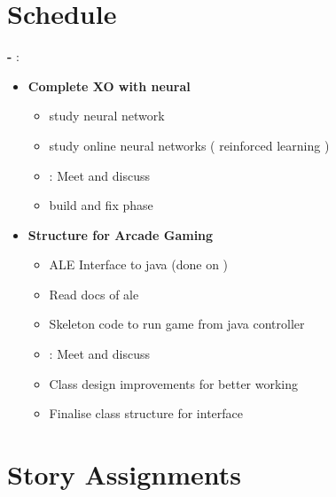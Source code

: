 \documentclass[12pt]{article}
\begin{document}
\section{Schedule}
\textbf{ - } : 
\begin{itemize}
	\item \textbf{Complete XO with neural}
	\begin{itemize}
		\item study neural network \cite{k}
		\item study online neural networks ( reinforced learning ) \cite{k}
		\item {} : Meet and discuss \cite{k}\cite{n}\cite{j}
		\item build and fix phase \cite{j}
	\end{itemize}
	\item \textbf{Structure for Arcade Gaming}
	\begin{itemize}
		\item ALE Interface to java (done on ) \cite{n}
		\item Read docs of ale \cite{n}
		\item Skeleton code to run game from java controller \cite{n}
		\item {} : Meet and discuss \cite{k}\cite{n}\cite{j}
		\item Class design improvements for better working \cite{n}\cite{k}\cite{j}
		\item Finalise class structure for interface \cite{n}\cite{j}
	\end{itemize}
\end{itemize}


\clearpage
\section{Story Assignments}


\end{document}
